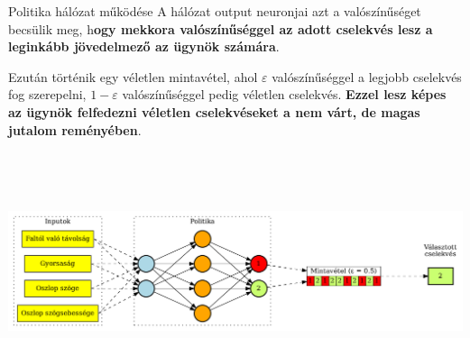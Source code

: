 \documentclass[english, aspectratio=169]{beamer}
\begin{document}
\begin{frame}{Politika hálózat működése}
A hálózat output neuronjai azt a valószínűséget becsülik meg, h\textbf{ogy mekkora valószínűséggel az adott cselekvés lesz a leginkább jövedelmező az ügynök számára}.\par\smallskip
Ezután történik egy véletlen mintavétel, ahol $\varepsilon$ valószínűséggel a legjobb cselekvés fog szerepelni, $1-\varepsilon$ valószínűséggel pedig véletlen cselekvés. \textbf{Ezzel lesz képes az ügynök felfedezni véletlen cselekvéseket a nem várt, de magas jutalom reményében}. 
\begin{center}
\includegraphics[width=14cm, height=7cm, keepaspectratio]{graphs/reinforcement_6.png}
\end{center}
\end{frame}
\end{document}
